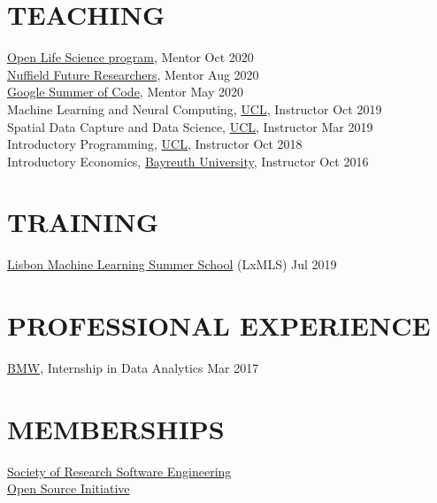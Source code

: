 \documentclass{cv}
\begin{document}
\section{TEACHING}

\href{https://openlifesci.org}{Open Life Science program}, Mentor \hfill Oct 2020 \\

\href{https://www.nuffieldfoundation.org/students-teachers/nuffield-future-researchers}{Nuffield Future Researchers}, Mentor \hfill Aug 2020 \\

\href{https://summerofcode.withgoogle.com/archive/2020/projects/6262209727954944/}{Google Summer of Code}, Mentor \hfill May 2020 \\

Machine Learning and Neural Computing, \href{https://www.ucl.ac.uk/}{UCL}, Instructor \hfill Oct 2019 \\

Spatial Data Capture and Data Science, \href{https://www.ucl.ac.uk/}{UCL}, Instructor \hfill Mar 2019 \\

Introductory Programming, \href{https://www.ucl.ac.uk/}{UCL}, Instructor \hfill Oct 2018 \\

Introductory Economics, \href{https://www.uni-bayreuth.de/en/}{Bayreuth University}, Instructor \hfill Oct 2016 \\

\section{TRAINING}

\href{http://lxmls.it.pt/}{Lisbon Machine Learning Summer School} (LxMLS) \hfill Jul 2019 \\


\section{PROFESSIONAL EXPERIENCE}

\href{https://www.bmw.com/en/index.html}{BMW}, Internship in Data Analytics  \hfill Mar 2017 \\



\section{MEMBERSHIPS}

\href{https://society-rse.org/}{Society of Research Software Engineering} \\

\href{http://opensource.org}{Open Source Initiative}
\end{document}
